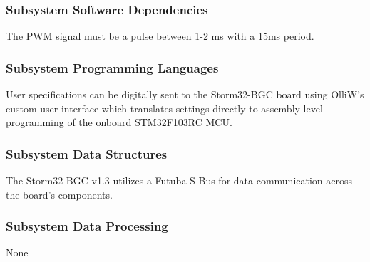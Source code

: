 \subsubsection{Subsystem Software Dependencies}
The PWM signal must be a pulse between 1-2 ms with a 15ms period.

\subsubsection{Subsystem Programming Languages}
User specifications can be digitally sent to the Storm32-BGC board using OlliW's custom user interface which translates settings directly to assembly level programming of the onboard STM32F103RC MCU.

\subsubsection{Subsystem Data Structures}
The Storm32-BGC v1.3 utilizes a Futuba S-Bus for data communication across the board's components.

\subsubsection{Subsystem Data Processing}
None
